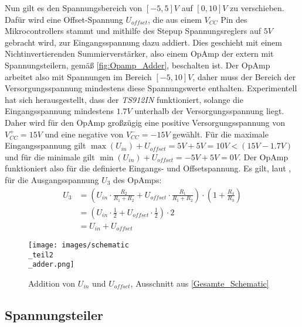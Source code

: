 Nun gilt es den Spannungsbereich von $[-5, 5]V$ auf $[0, 10]V$ zu verschieben.
Dafür wird eine Offset-Spannung $U_{offset}$, die aus einem $V_{CC}$ Pin
des Mikrocontrollers stammt und mithilfe des Stepup Spannungsreglers auf $5V$ gebracht wird, zur Eingangsspannung dazu addiert.
Dies geschieht mit einem Nichtinvertierenden Summierverstärker, also einem OpAmp der extern mit
Spannungsteilern, gemäß \autoref{fig:Opamp_Adder}, beschalten ist.
Der OpAmp arbeitet also mit Spannungen im Bereich $[-5,10]V$,
daher muss der Bereich der Versorgungsspannung mindestens diese Spannungswerte enthalten.
Experimentell hat sich herausgestellt, dass der \textit{TS912IN} funktioniert, solange die Eingangsspannung
mindestens $1.7V$ unterhalb der Versorgungsspannung liegt.
Daher wird für den OpAmp großzügig eine positive Versorgungsspannung von $V^+_{CC} = 15V$ und eine 
negative von $V^-_{CC} = -15V$ gewählt.
Für die maximale Eingangsspannung gilt $\max(U_{in}) + U_{offset} = 5V + 5V = 10V < (15V - 1.7V)$
und für die minimale gilt $\min(U_{in}) + U_{offset} = -5V + 5V = 0V$.
Der OpAmp funktioniert also für die definierte Eingangs- und Offsetspannung. \newline
Es gilt, laut \cite{Opamp_adder}, für die Ausgangsspannung $U_3$ des OpAmps:
\begin{align*}
U_3 &= (U_{in} \cdot \frac{R_2}{R_1 + R_2} + U_{offset} \cdot \frac{R_1}{R_1 + R_2}) \cdot(1 + \frac{R_4}{R_3}) \\
	&= (U_{in} \cdot \frac{1}{2} + U_{offset} \cdot \frac{1}{2}) \cdot 2 \\
	&= U_{in} + U_{offset}
\end{align*}

\begin{figure}[h!]
	\centering
	\texttt{[image: images/schematic\\\_teil2\\\_adder.png]}
	\caption{Addition von $U_{in}$ und $U_{offset}$, Ausschnitt aus \ref{Gesamte_Schematic}}
	\label{fig:Opamp_Adder}
\end{figure}


\subsection{Spannungsteiler}
\label{Spannungsteiler}

